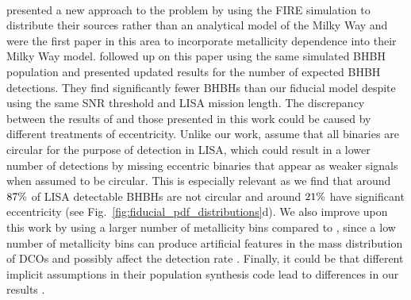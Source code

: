 \paragraph{\citet{Lamberts+2018}} presented a new approach to the problem by using the FIRE simulation \citep{Hopkins+2014} to distribute their sources rather than an analytical model of the Milky Way and were the first paper in this area to incorporate metallicity dependence into their Milky Way model. \citet{Sesana+2020} followed up on this paper using the same simulated BHBH population and presented updated results for the number of expected BHBH detections. They find significantly fewer BHBHs than our fiducial model despite using the same SNR threshold and LISA mission length.
%
The discrepancy between the results of \citet{Sesana+2020} and those presented in this work could be caused by different treatments of eccentricity. Unlike our work, \citet{Sesana+2020} assume that all binaries are circular for the purpose of detection in LISA, which could result in a lower number of detections by missing eccentric binaries that appear as weaker signals when assumed to be circular. This is especially relevant as we find that around $87\%{}$ of LISA detectable BHBHs are not circular and around $21\%{}$ have significant eccentricity (see Fig.~\ref{fig:fiducial_pdf_distributions}d). We also improve upon this work by using a larger number of metallicity bins compared to \citet{Sesana+2020}, since a low number of metallicity bins can produce artificial features in the mass distribution of DCOs and possibly affect the detection rate \citep[see][ and also appendix~\ref{app:mw_changes} for further discussion]{Dominik+2015, Neijssel+2019, Kummer_thesis}. Finally, it could be that different implicit assumptions in their population synthesis code lead to differences in our results \citep{Toonen+2014}.

